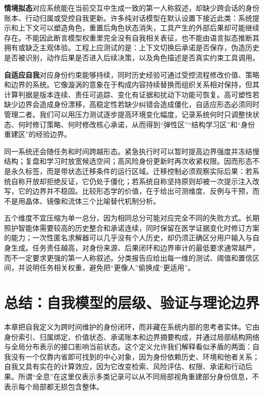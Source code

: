 \textbf{情境拟态}对应系统能在当前交互中生成一致的第一人称叙述，却缺少跨会话的身份账本、行动归属或受控自我更新。许多纯对话模型在默认设置下接近此类：系统提示和上下文可以塑造角色，重置后角色状态消失，工具产生的外部后果却可能继续存在。不能因此断言模型权重里完全没有自我相关表征，也不能由语言拟态推断其拥有或缺乏主观体验。工程上应测试的是：上下文切换后承诺是否保存，伪造历史是否被识别，动作后果是否进入后续决策，以及角色描述是否真实约束工具调用。

\textbf{自适应自我}对应身份约束能够持续，同时历史经验可通过受控流程修改价值、策略和边界的系统。它像漩涡的意象在于构成内容持续替换而组织关系相对保持，但其计算判据是版本连续、责任可追踪、变化有证据和扰动下功能可恢复。高可塑性若缺少边界会造成身份漂移，高稳定性若缺少纠错会造成僵化，自适应形态必须同时管理二者。我们可以用压力测试逐步提高环境变化幅度，记录系统何时只调整快状态、何时修订策略、何时修改核心承诺，从而得到“弹性区”“结构学习区”和“身份重建区”的经验边界。

同一系统还会随任务和时间跨越形态。紧急执行时可以暂时提高边界强度并冻结慢结构；复盘和学习时放宽候选空间；高风险身份更新时再次收紧权限。因而形态不是永久标签，而是带状态迁移条件的运行区域。迁移控制必须观察实际后果：若系统自称开放却拒绝反证，它仍处于僵化；若系统自称坚持原则却被一次提示注入改写，它的边界并不稳固。比较形态学的价值，在于给出可测维度、反例与干预，而不是用晶体、镜像和流体三个比喻替代机制分析。

五个维度不宜压缩为单一总分，因为相同总分可能对应完全不同的失败方式。长期照护智能体需要较高的历史整合和承诺连续，同时保留在医学证据变化时修订方案的能力；一次性匿名求解器可以几乎没有个人历史，却仍须正确区分用户输入与自身生成。任务责任越高，对身份来源、后果闭环和边界审计的最低要求通常越严，而不一定要求更强的第一人称叙述。分类报告应给出每一维的测试、阈值和置信区间，并说明任务相关权重，避免把“更像人”偷换成“更适用”。

\section{总结：自我模型的层级、验证与理论边界}
\label{sec:section_440}

本章把自我定义为跨时间维护的身份闭环，而非藏在系统内部的思考者实体。它由身份索引、归属绑定、价值状态、承诺账本和边界摘要构成，并通过局部结构网络与全局分布表示的接口影响当前状态。这个定义允许我们解释看似矛盾的两面：自我没有一个仅靠内省即可找到的中心对象，因为身份依赖历史、环境和他者关系；自我又具有实在的计算效应，因为它改变检索、风险评估、权限、承诺和行动后果。所谓“全息”在这里仅表示多类记录可以从不同局部视角重建部分身份信息，不表示每个局部都无损包含整体。

